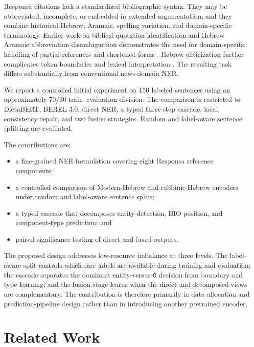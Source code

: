 \documentclass[conference,a4paper]{IEEEtran}
\begin{document}
Responsa citations lack a standardized bibliographic syntax. They may be abbreviated, incomplete, or embedded in extended argumentation, and they combine historical Hebrew, Aramaic, spelling variation, and domain-specific terminology. Earlier work on biblical-quotation identification and Hebrew-Aramaic abbreviation disambiguation demonstrates the need for domain-specific handling of partial references and shortened forms \cite{hacohen2010,hacohen2010haads}. Hebrew cliticization further complicates token boundaries and lexical interpretation \cite{mordecai2005hebrew,itai2008,tsarfaty2019hebrewnlp}. The resulting task differs substantially from conventional news-domain NER.

We report a controlled initial experiment on 150 labeled sentences using an approximately 70/30 train--evaluation division. The comparison is restricted to DictaBERT, BEREL 3.0, direct NER, a typed three-step cascade, local consistency repair, and two fusion strategies. Random and label-aware sentence splitting are evaluated.

The contributions are:

\begin{itemize}
  \item a fine-grained NER formulation covering eight Responsa reference components;
  \item a controlled comparison of Modern-Hebrew and rabbinic-Hebrew encoders under random and label-aware sentence splits;
  \item a typed cascade that decomposes entity detection, BIO position, and component-type prediction; and
  \item paired significance testing of direct and fused outputs.
\end{itemize}

The proposed design addresses low-resource imbalance at three levels. The label-aware split controls which rare labels are available during training and evaluation; the cascade separates the dominant entity-versus-\texttt{O} decision from boundary and type learning; and the fusion stage learns when the direct and decomposed views are complementary. The contribution is therefore primarily in data allocation and prediction-pipeline design rather than in introducing another pretrained encoder.

\section{Related Work}
\end{document}
